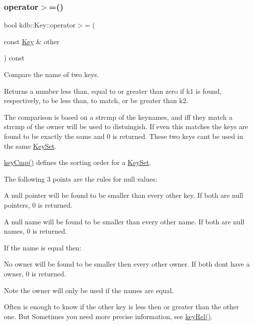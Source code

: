\subsubsection{\texorpdfstring{operator$>$=()}{operator>=()}}
{\footnotesize\ttfamily bool kdb\+::\+Key\+::operator$>$= (\begin{DoxyParamCaption}\item[{const \hyperlink{classkdb_1_1Key}{Key} \&}]{other }\end{DoxyParamCaption}) const\hspace{0.3cm}{\ttfamily [inline]}}



Compare the name of two keys. 

\begin{DoxyReturn}{Returns}
a number less than, equal to or greater than zero if k1 is found, respectively, to be less than, to match, or be greater than k2.
\end{DoxyReturn}
The comparison is based on a strcmp of the keynames, and iff they match a strcmp of the owner will be used to distuingish. If even this matches the keys are found to be exactly the same and 0 is returned. These two keys can\textquotesingle{}t be used in the same \hyperlink{classkdb_1_1KeySet}{Key\+Set}.

\hyperlink{group__keytest_gaf6e66e12fe04d535a5d1c8218ced803e}{key\+Cmp()} defines the sorting order for a \hyperlink{classkdb_1_1KeySet}{Key\+Set}.

The following 3 points are the rules for null values\+:


\begin{DoxyItemize}
\item A null pointer will be found to be smaller than every other key. If both are null pointers, 0 is returned.
\item A null name will be found to be smaller than every other name. If both are null names, 0 is returned.
\end{DoxyItemize}

If the name is equal then\+:


\begin{DoxyItemize}
\item No owner will be found to be smaller then every other owner. If both don\textquotesingle{}t have a owner, 0 is returned.
\end{DoxyItemize}

\begin{DoxyNote}{Note}
the owner will only be used if the names are equal.
\end{DoxyNote}
Often is enough to know if the other key is less then or greater than the other one. But Sometimes you need more precise information, see \hyperlink{group__keytest_ga6bb0f95ac34ce9c42d61bb35a76139d0}{key\+Rel()}.

